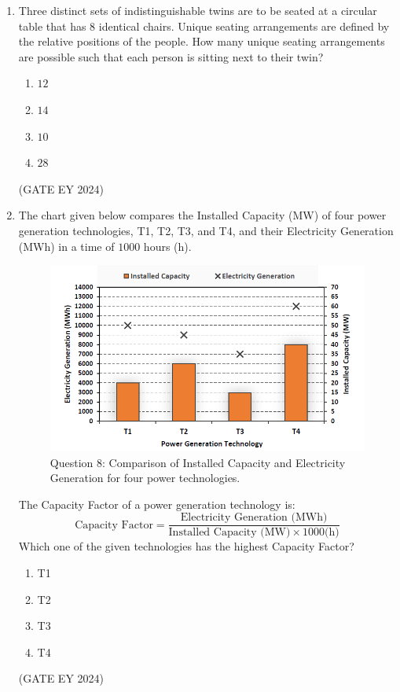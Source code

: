 \documentclass[journal]{IEEEtran}
\begin{document}
\begin{enumerate}
\item Three distinct sets of indistinguishable twins are to be seated at a circular table that has $8$ identical chairs. Unique seating arrangements are defined by the relative positions of the people. How many unique seating arrangements are possible such that each person is sitting next to their twin?
    \begin{multicols}{2}
    \begin{enumerate}
        \item $12$
        \item $14$
        \item $10$
        \item $28$
    \end{enumerate}
    \end{multicols}
\hfill{(GATE EY 2024)}

\item The chart given below compares the Installed Capacity (MW) of four power generation technologies, T1, T2, T3, and T4, and their Electricity Generation (MWh) in a time of $1000$ hours (h).
\begin{figure}[!ht]
    \centering
    \includegraphics[width=0.3\columnwidth]{figs/Q-8.png}
    \caption{Question 8: Comparison of Installed Capacity and Electricity Generation for four power technologies.}
    \label{Q.8}
\end{figure}
The Capacity Factor of a power generation technology is:
$$ \text{Capacity Factor} = \frac{\text{Electricity Generation (MWh)}}{\text{Installed Capacity (MW)} \times 1000 \text{(h)}} $$
Which one of the given technologies has the highest Capacity Factor?
    \begin{multicols}{2}
    \begin{enumerate}
        \item T1
        \item T2
        \item T3
        \item T4
    \end{enumerate}
    \end{multicols}
\hfill{(GATE EY 2024)}


\end{enumerate}
\end{document}
